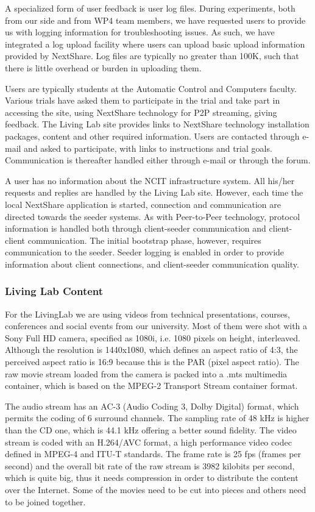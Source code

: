 A specialized form of user feedback is user log files. During experiments,
both from our side and from WP4 team members, we have requested users to
provide us with logging information for troubleshooting issues. As such, we
have integrated a log upload facility where users can upload basic upload
information provided by NextShare. Log files are typically no greater than
100K, such that there is little overhead or burden in uploading them.

Users are typically students at the Automatic Control and Computers faculty.
Various trials have asked them to participate in the trial and take part in
accessing the site, using NextShare technology for P2P streaming, giving
feedback. The Living Lab site provides links to NextShare technology
installation packages, content and other required information. Users are
contacted through e-mail and asked to participate, with links to instructions
and trial goals. Communication is thereafter handled either through e-mail or
through the forum.

A user has no information about the NCIT infrastructure system. All his/her
requests and replies are handled by the Living Lab site. However, each time
the local NextShare application is started, connection and communication are
directed towards the seeder systems. As with Peer-to-Peer technology, protocol
information is handled both through client-seeder communication and
client-client communication. The initial bootstrap phase, however, requires
communication to the seeder. Seeder logging is enabled in order to provide
information about client connections, and client-seeder communication quality.

\subsubsection{Living Lab Content}

For the LivingLab we are using videos from technical presentations, courses,
conferences and social events from our university. Most of them were shot with
a Sony Full HD camera, specified as 1080i, i.e. 1080 pixels on height,
interleaved. Although the resolution is 1440x1080, which defines an aspect
ratio of 4:3, the perceived aspect ratio is 16:9 because this is the PAR
(pixel aspect ratio). The raw movie stream loaded from the camera is packed
into a .mts multimedia container, which is based on the MPEG-2 Transport
Stream container format.

The audio stream has an AC-3 (Audio Coding 3, Dolby Digital) format, which
permits the coding of 6 surround channels. The sampling rate of 48 kHz is
higher than the CD one, which is 44.1 kHz offering a better sound fidelity.
The video stream is coded with an H.264/AVC format, a high performance video
codec defined in MPEG-4 and ITU-T standards.  The frame rate is 25 fps (frames
per second) and the overall bit rate of the raw stream is 3982 kilobits per
second, which is quite big, thus it needs compression in order to distribute
the content over the Internet. Some of the movies need to be cut into pieces
and others need to be joined together.

